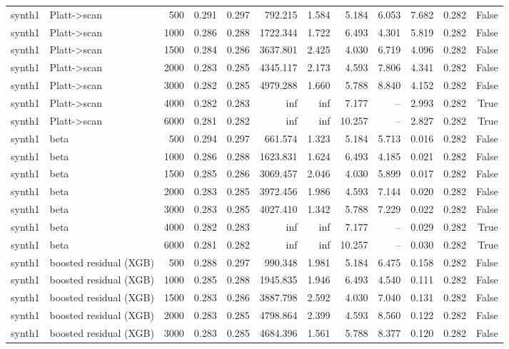 \begin{tabular}{llrrrrrrrrrr}
synth1 & Platt->scan & 500 & 0.291 & 0.297 & 792.215 & 1.584 & 5.184 & 6.053 & 7.682 & 0.282 & False \\
synth1 & Platt->scan & 1000 & 0.286 & 0.288 & 1722.344 & 1.722 & 6.493 & 4.301 & 5.819 & 0.282 & False \\
synth1 & Platt->scan & 1500 & 0.284 & 0.286 & 3637.801 & 2.425 & 4.030 & 6.719 & 4.096 & 0.282 & False \\
synth1 & Platt->scan & 2000 & 0.283 & 0.285 & 4345.117 & 2.173 & 4.593 & 7.806 & 4.341 & 0.282 & False \\
synth1 & Platt->scan & 3000 & 0.282 & 0.285 & 4979.288 & 1.660 & 5.788 & 8.840 & 4.152 & 0.282 & False \\
synth1 & Platt->scan & 4000 & 0.282 & 0.283 & inf & inf & 7.177 & -- & 2.993 & 0.282 & True \\
synth1 & Platt->scan & 6000 & 0.281 & 0.282 & inf & inf & 10.257 & -- & 2.827 & 0.282 & True \\
synth1 & beta & 500 & 0.294 & 0.297 & 661.574 & 1.323 & 5.184 & 5.713 & 0.016 & 0.282 & False \\
synth1 & beta & 1000 & 0.286 & 0.288 & 1623.831 & 1.624 & 6.493 & 4.185 & 0.021 & 0.282 & False \\
synth1 & beta & 1500 & 0.285 & 0.286 & 3069.457 & 2.046 & 4.030 & 5.899 & 0.017 & 0.282 & False \\
synth1 & beta & 2000 & 0.283 & 0.285 & 3972.456 & 1.986 & 4.593 & 7.144 & 0.020 & 0.282 & False \\
synth1 & beta & 3000 & 0.283 & 0.285 & 4027.410 & 1.342 & 5.788 & 7.229 & 0.022 & 0.282 & False \\
synth1 & beta & 4000 & 0.282 & 0.283 & inf & inf & 7.177 & -- & 0.029 & 0.282 & True \\
synth1 & beta & 6000 & 0.281 & 0.282 & inf & inf & 10.257 & -- & 0.030 & 0.282 & True \\
synth1 & boosted residual (XGB) & 500 & 0.288 & 0.297 & 990.348 & 1.981 & 5.184 & 6.475 & 0.158 & 0.282 & False \\
synth1 & boosted residual (XGB) & 1000 & 0.285 & 0.288 & 1945.835 & 1.946 & 6.493 & 4.540 & 0.111 & 0.282 & False \\
synth1 & boosted residual (XGB) & 1500 & 0.283 & 0.286 & 3887.798 & 2.592 & 4.030 & 7.040 & 0.131 & 0.282 & False \\
synth1 & boosted residual (XGB) & 2000 & 0.283 & 0.285 & 4798.864 & 2.399 & 4.593 & 8.560 & 0.122 & 0.282 & False \\
synth1 & boosted residual (XGB) & 3000 & 0.283 & 0.285 & 4684.396 & 1.561 & 5.788 & 8.377 & 0.120 & 0.282 & False \\

\end{tabular}
